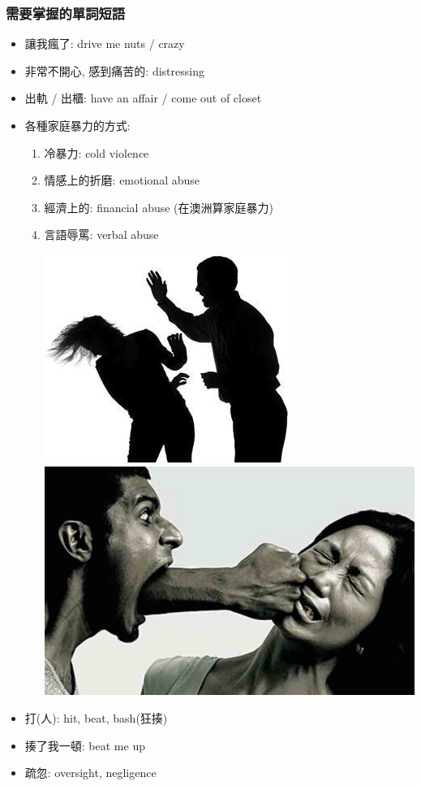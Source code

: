 \subsubsection*{需要掌握的單詞短語}
\begin{itemize}
  \itemsep0em
  \item 讓我瘋了: drive me nuts / crazy
  \item 非常不開心, 感到痛苦的: distressing
  \item 出軌 / 出櫃: have an affair / come out of closet
  \item 各種家庭暴力的方式:
  \begin{enumerate}
    \itemsep0em
    \item 冷暴力: cold violence
    \item 情感上的折磨: emotional abuse
    \item 經濟上的: financial abuse (在澳洲算家庭暴力)
    \item 言語辱罵: verbal abuse
    \begin{center}
      \includegraphics[scale=.5]{pics/abuse}
      \includegraphics[scale=.3]{pics/verbal-abuse}
    \end{center}
  \end{enumerate}
  \item 打(人): hit, beat, bash(狂揍)
  \item 揍了我一頓: beat me up
  \item 疏忽: oversight, negligence
\end{itemize}

